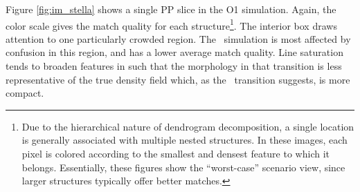 Figure \ref{fig:im_stella} shows a single PP slice in the O1
simulation. Again, the color scale gives the match quality for each
structure\footnote{Due to the hierarchical nature of dendrogram decomposition, a single location is generally associated with multiple nested structures. In these images, each pixel is colored according to the smallest and densest feature to which it belongs. Essentially, these figures show the ``worst-case'' scenario view, since larger structures typically offer better matches.}. The interior box draws attention to one particularly crowded region. The \coa\, simulation
is most affected by confusion in this region, and has a lower average match quality.  Line saturation tends to broaden
features in \coa such that the morphology in that transition
is less representative of the true density field which, as the \coc\, transition suggests, is more compact.

